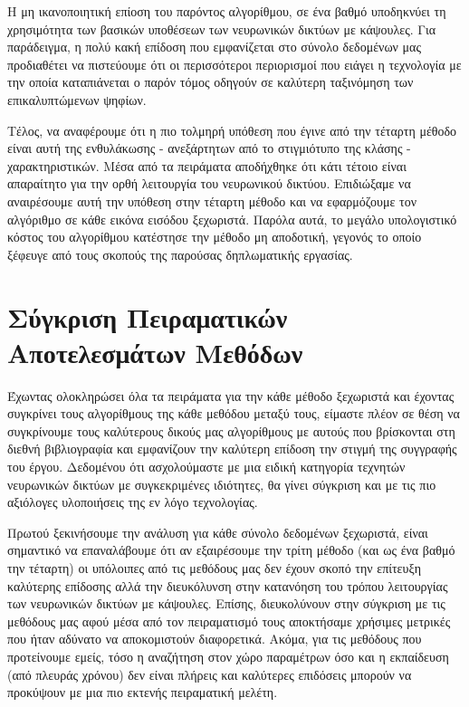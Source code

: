 Η μη ικανοποιητική επίοση του παρόντος αλγορίθμου, σε ένα βαθμό υποδηκνύει τη χρησιμότητα των βασικών υποθέσεων των νευρωνικών δικτύων με κάψουλες. Για παράδειγμα, η πολύ κακή επίδοση που εμφανίζεται στο σύνολο δεδομένων  μας προδιαθέτει να πιστεύουμε ότι οι περισσότεροι περιορισμοί που ειάγει η τεχνολογία με την οποία καταπιάνεται ο παρόν τόμος οδηγούν σε καλύτερη ταξινόμηση των επικαλυπτώμενων ψηφίων.\par

Τέλος, να αναφέρουμε ότι η πιο τολμηρή υπόθεση που έγινε από την τέταρτη μέθοδο είναι αυτή της ενθυλάκωσης - ανεξάρτητων από το στιγμιότυπο της κλάσης - χαρακτηριστικών. Μέσα από τα πειράματα αποδήχθηκε ότι κάτι τέτοιο είναι απαραίτητο για την ορθή λειτουργία του νευρωνικού δικτύου. Επιδιώξαμε να αναιρέσουμε αυτή την υπόθεση στην τέταρτη μέθοδο και να εφαρμόζουμε τον αλγόριθμο  σε κάθε εικόνα εισόδου ξεχωριστά. Παρόλα αυτά, το μεγάλο υπολογιστικό κόστος του αλγορίθμου  κατέστησε την μέθοδο μη αποδοτική, γεγονός το οποίο ξέφευγε από τους σκοπούς της παρούσας δηπλωματικής εργασίας.

\section{Σύγκριση Πειραματικών Αποτελεσμάτων Μεθόδων}
Έχωντας ολοκληρώσει όλα τα πειράματα για την κάθε μέθοδο ξεχωριστά και έχοντας συγκρίνει τους αλγορίθμους της κάθε μεθόδου μεταξύ τους, είμαστε πλέον σε θέση να συγκρίνουμε τους καλύτερους δικούς μας αλγορίθμους με αυτούς που βρίσκονται στη διεθνή βιβλιογραφία και εμφανίζουν την καλύτερη επίδοση την στιγμή της συγγραφής του έργου. Δεδομένου ότι ασχολούμαστε με μια ειδική κατηγορία τεχνητών νευρωνικών δικτύων με συγκεκριμένες ιδιότητες, θα γίνει σύγκριση και με τις πιο αξιόλογες υλοποιήσεις της εν λόγο τεχνολογίας.\par

Πρωτού ξεκινήσουμε την ανάλυση για κάθε σύνολο δεδομένων ξεχωριστά, είναι σημαντικό να επαναλάβουμε ότι αν εξαιρέσουμε την τρίτη μέθοδο (και ως ένα βαθμό την τέταρτη) οι υπόλοιπες από τις μεθόδους μας δεν έχουν σκοπό την επίτευξη καλύτερης επίδοσης αλλά την διευκόλυνση στην κατανόηση του τρόπου λειτουργίας των νευρωνικών δικτύων με κάψουλες. Επίσης, διευκολύνουν στην σύγκριση με τις μεθόδους μας αφού μέσα από τον πειραματισμό τους αποκτήσαμε χρήσιμες μετρικές που ήταν αδύνατο να αποκομιστούν διαφορετικά. Ακόμα, για τις μεθόδους που προτείνουμε εμείς, τόσο η αναζήτηση στον χώρο παραμέτρων όσο και η εκπαίδευση (από πλευράς χρόνου) δεν είναι πλήρεις και καλύτερες επιδόσεις μπορούν να προκύψουν με μια πιο εκτενής πειραματική μελέτη. \par


